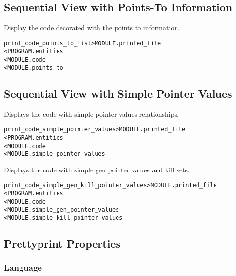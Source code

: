 \documentclass[a4paper]{report}
\newenvironment{PipsMake}{\begin{alltt}}{\end{alltt}}
\newenvironment{PipsPass}[1]{\label{pass:#1}}{}
\begin{document}
\subsection{Sequential View with Points-To Information}

Display the code decorated with the points to information.

\begin{PipsMake}
print_code_points_to_list      > MODULE.printed_file
        < PROGRAM.entities
        < MODULE.code
        < MODULE.points_to
\end{PipsMake}

\subsection{Sequential View with Simple Pointer Values}

\begin{PipsPass}{print_code_simple_pointer_values}
Displays the code with simple pointer values relationships.
\end{PipsPass}

\begin{PipsMake}
print_code_simple_pointer_values      > MODULE.printed_file
        < PROGRAM.entities
        < MODULE.code
        < MODULE.simple_pointer_values
\end{PipsMake}

\begin{PipsPass}{print_code_genkill_pointer_values}
Displays the code with simple gen pointer values and kill sets.
\end{PipsPass}

\begin{PipsMake}
print_code_simple_gen_kill_pointer_values      > MODULE.printed_file
        < PROGRAM.entities
        < MODULE.code
        < MODULE.simple_gen_pointer_values
        < MODULE.simple_kill_pointer_values

\end{PipsMake}

\subsection{Prettyprint Properties}


\subsubsection{Language}
\end{document}
